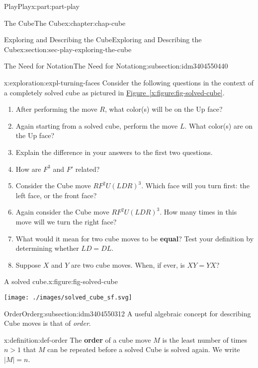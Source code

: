 \documentclass[oneside,10pt,]{book}
\newcommand{\xreffont}{\relax}
\newcommand{\terminology}[1]{\textbf{#1}}
\numberwithin{equation}{section}
\newcommand{\gt}{>}
\begin{document}
\begin{partptx}{Play}{}{Play}{}{}{x:part:part-play}
\begin{chapterptx}{The Cube}{}{The Cube}{}{}{x:chapter:chap-cube}
\begin{sectionptx}{Exploring and Describing the Cube}{}{Exploring and Describing the Cube}{}{}{x:section:sec-play-exploring-the-cube}
\begin{subsectionptx}{The Need for Notation}{}{The Need for Notation}{}{}{g:subsection:idm3404550440}
\begin{exploration}{}{x:exploration:expl-turning-faces}%
Consider the following questions in the context of a completely solved cube as pictured in \hyperref[x:figure:fig-solved-cube]{Figure~{\xreffont\ref{x:figure:fig-solved-cube}}}.%
%
\begin{enumerate}
\item{}After performing the move \(R\), what color(s) will be on the Up face?%
\item{}Again starting from a solved cube, perform the move \(L\). What color(s) are on the Up face?%
\item{}Explain the difference in your answers to the first two questions.%
\item{}How are \(F^3\) and \(F'\) related?%
\item{}Consider the Cube move \(RF^2 U (LDR)^3\). Which face will you turn first: the left face, or the front face?%
\item{}Again consider the Cube move \(RF^2 U (LDR)^3\). How many times in this move will we turn the right face?%
\item{}What would it mean for two cube moves to be \terminology{equal}? Test your definition by determining whether \(LD = DL\).%
\item{}Suppose \(X\) and \(Y\) are two cube moves. When, if ever, is \(XY = YX\)?%
\end{enumerate}
\begin{figureptx}{A solved cube.}{x:figure:fig-solved-cube}{}%
\begin{image}{0.25}{0.5}{0.25}%
\texttt{[image: ./images/solved\_cube\_sf.svg]}
\end{image}%
\tcblower
\end{figureptx}%
\end{exploration}%
\end{subsectionptx}
%
%
\typeout{************************************************}
\typeout{************************************************}
%
\begin{subsectionptx}{Order}{}{Order}{}{}{g:subsection:idm3404550312}
A useful algebraic concept for describing Cube moves is that of \emph{order}.%
\begin{definition}{}{x:definition:def-order}%
%
The \terminology{order} of a cube move \(M\) is the least number of times \(n \gt 1\) that \(M\) can be repeated before a solved Cube is solved again. We write \(|M| = n\).%
\end{definition}

\end{subsectionptx}
\end{sectionptx}
\end{chapterptx}
\end{partptx}
\end{document}
